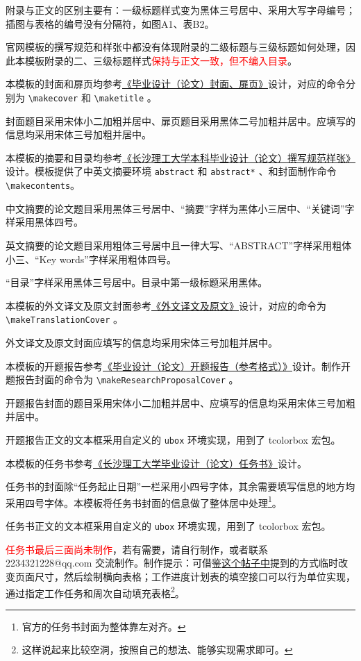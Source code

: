 附录与正文的区别主要有：一级标题样式变为黑体三号居中、采用大写字母编号；插图与表格的编号没有分隔符，如图A1、表B2。

官网模板的撰写规范和样张中都没有体现附录的二级标题与三级标题如何处理，因此本模板附录的二、三级标题样式\textcolor{red}{保持与正文一致，但不编入目录}。

本模板的封面和扉页均参考\href{https://www.csust.edu.cn/jwc/info/1142/3596.htm}{《毕业设计（论文）封面、扉页》}设计，对应的命令分别为 \verb!\makecover! 和 \verb!\maketitle! 。

封面题目采用宋体小二加粗并居中、扉页题目采用黑体二号加粗并居中。应填写的信息均采用宋体三号加粗并居中。

本模板的摘要和目录均参考\href{https://www.csust.edu.cn/jwc/info/1142/3595.htm}{《长沙理工大学本科毕业设计（论文）撰写规范样张》}设计。模板提供了中英文摘要环境 \verb!abstract! 和 \verb!abstract*! 、和封面制作命令 \verb!\makecontents!。

中文摘要的论文题目采用黑体三号居中、“摘要”字样为黑体小三居中、“关键词”字样采用黑体四号。

英文摘要的论文题目采用粗体三号居中且一律大写、“ABSTRACT”字样采用粗体小三、“Key words”字样采用粗体四号。

“目录”字样采用黑体三号居中。目录中第一级标题采用黑体。


本模板的外文译文及原文封面参考\href{https://www.csust.edu.cn/jwc/info/1142/3598.htm}{《外文译文及原文》}设计，对应的命令为\\ \verb!\makeTranslationCover! 。

外文译文及原文封面应填写的信息均采用宋体三号加粗并居中。

本模板的开题报告参考\href{https://www.csust.edu.cn/jwc/info/1142/3599.htm}{《毕业设计（论文）开题报告（参考格式）》}设计。制作开题报告封面的命令为 \verb!\makeResearchProposalCover! 。

开题报告封面的题目采用宋体小二加粗并居中、应填写的信息均采用宋体三号加粗并居中。

开题报告正文的文本框采用自定义的 \verb!ubox! 环境实现，用到了 tcolorbox 宏包。


本模板的任务书参考\href{https://www.csust.edu.cn/jwc/info/1142/3600.htm}{《长沙理工大学毕业设计（论文）任务书》}设计。

任务书的封面除“任务起止日期”一栏采用小四号字体，其余需要填写信息的地方均采用四号字体。本模板将任务书封面的信息做了整体居中处理\footnote{官方的任务书封面为整体靠左对齐。}。

任务书正文的文本框采用自定义的 \verb!ubox! 环境实现，用到了 tcolorbox 宏包。

\textcolor{red}{任务书最后三面尚未制作}，若有需要，请自行制作，或者联系 2234321228@qq.com 交流制作。制作提示：可借鉴\href{https://stackoverflow.com/questions/2812892/change-paper-size-in-the-middle-of-a-latex-document}{这个帖子中}提到的方式临时改变页面尺寸，然后绘制横向表格；工作进度计划表的填空接口可以行为单位实现，通过指定工作任务和周次自动填充表格\footnote{这样说起来比较空洞，按照自己的想法、能够实现需求即可。}。

